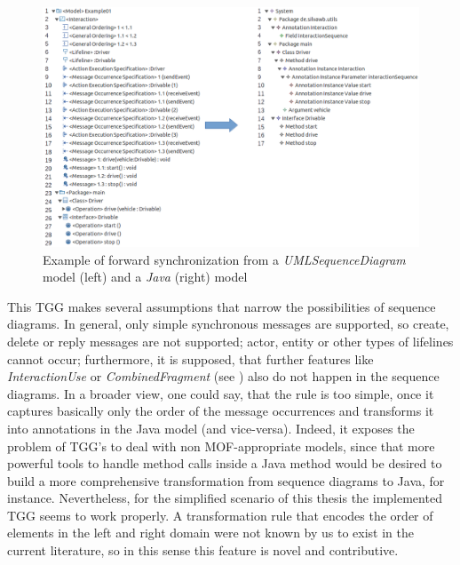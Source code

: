 \documentclass[tuberlin,cic,tc,english,noabntcite]{iiufrgs}
\begin{document}
\begin{figure}[h]
    \caption{Example of forward synchronization from a \emph{UMLSequenceDiagram} model (left) and a \emph{Java} (right) model}
    \begin{center}
       	\includegraphics[width=\textwidth]{umlSequenceDiagram2java_Example01}
    \end{center}
    \label{fig:umlSequenceDiagram2java_Example01}
\end{figure}

This TGG makes several assumptions that narrow the possibilities of sequence diagrams. In general, only simple synchronous messages are supported, so create, delete or reply messages are not supported; actor, entity or other types of lifelines cannot occur; furthermore, it is supposed, that further features like \emph{InteractionUse} or \emph{CombinedFragment} (see \citep[p. 621 and p. 630]{omg2015meta}) also do not happen in the sequence diagrams. In a broader view, one could say, that the rule is too simple, once it captures basically only the order of the message occurrences and transforms it into annotations in the Java model (and vice-versa). Indeed, it exposes the problem of TGG's to deal with non MOF-appropriate models, since that more powerful tools to handle method calls inside a Java method would be desired to build a more comprehensive transformation from sequence diagrams to Java, for instance. Nevertheless, for the simplified scenario of this thesis the implemented TGG seems to work properly. A transformation rule that encodes the order of elements in the left and right domain were not known by us to exist in the current literature, so in this sense this feature is novel and contributive.
\end{document}
